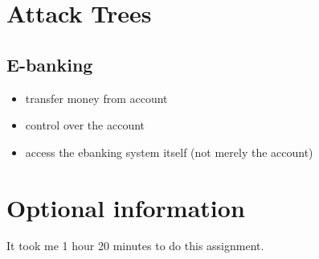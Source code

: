 \documentclass[12pt]{article}
\begin{document}
\section{Attack Trees}

\subsection{E-banking}

\begin{itemize}
  \item transfer money from account
  \item control over the account
  \item access the ebanking system itself (not merely the account)
\end{itemize}


\section{Optional information}
It took me 1 hour 20 minutes to do this assignment.
\end{document}
